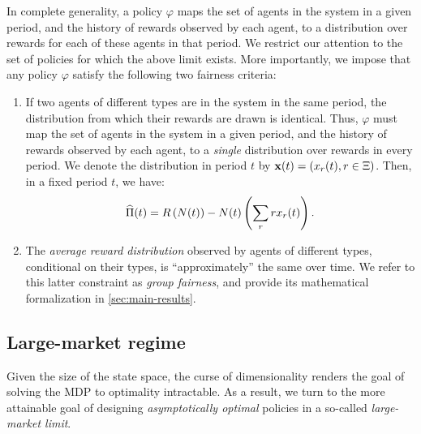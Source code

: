 \documentclass[12pt]{article}
\begin{document}
In complete generality, a policy $\varphi$ maps the set of  agents in the system in a given period, and the history of rewards observed by each agent, to a distribution over rewards for each of these agents in that period. We restrict our attention to the set of policies for which the above limit exists. More importantly, we impose that any policy $\varphi$ satisfy the following two fairness criteria:
\begin{enumerate}
    \item If two agents of different types are in the system {in the same period}, the distribution from which their rewards are drawn is identical. Thus, $\varphi$ must map the set of  agents in the system in a given period, and the history of rewards observed by each agent, to a {\it single} distribution over rewards in every period. We denote the distribution in period $t$ by $\mathbf{x}(t) = (x_r(t), r \in \Xi)$. {Then, in a fixed period $t$, we have:
        \begin{align*}
        \widehat{\Pi}(t) = R\left({N}(t)\right)-{N}(t)\left(\sum_r rx_r(t)\right). 
        \end{align*}} 
    \item The {\it average reward distribution} observed by agents of different types, conditional on their types, is ``approximately'' the same over time. We refer to this latter constraint as {\it group fairness}, and provide its mathematical formalization in \cref{sec:main-results}.
\end{enumerate}


\subsection{Large-market regime}

Given the size of the state space, the curse of dimensionality renders the goal of solving the MDP to optimality intractable. As a result, we turn to the more attainable goal of designing {\it asymptotically optimal} policies in a so-called {\it large-market limit}. %
\end{document}
